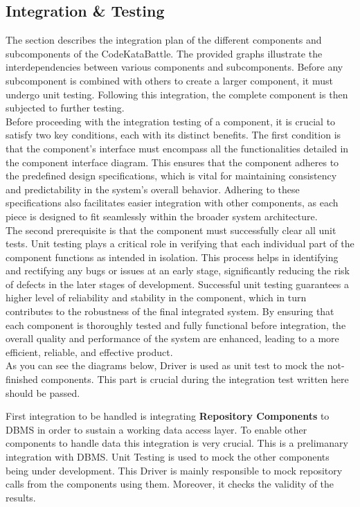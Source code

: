 \subsection{Integration \& Testing}
\indent The section describes the integration plan of the different components and subcomponents of the CodeKataBattle. The provided graphs illustrate the interdependencies between various components and subcomponents. Before any subcomponent is combined with others to create a larger component, it must undergo unit testing. Following this integration, the complete component is then subjected to further testing.
\\
\indent Before proceeding with the integration testing of a component, it is crucial to satisfy two key conditions, each with its distinct benefits. The first condition is that the component's interface must encompass all the functionalities detailed in the component interface diagram. This ensures that the component adheres to the predefined design specifications, which is vital for maintaining consistency and predictability in the system’s overall behavior. Adhering to these specifications also facilitates easier integration with other components, as each piece is designed to fit seamlessly within the broader system architecture.
\\
\indent The second prerequisite is that the component must successfully clear all unit tests. Unit testing plays a critical role in verifying that each individual part of the component functions as intended in isolation. This process helps in identifying and rectifying any bugs or issues at an early stage, significantly reducing the risk of defects in the later stages of development. Successful unit testing guarantees a higher level of reliability and stability in the component, which in turn contributes to the robustness of the final integrated system. By ensuring that each component is thoroughly tested and fully functional before integration, the overall quality and performance of the system are enhanced, leading to a more efficient, reliable, and effective product.
\\
\indent As you can see the diagrams below, Driver is used as unit test to mock the not-finished components. This part is crucial during the integration test written here should be passed. 

\newpage
\indent First integration to be handled is integrating \textbf{Repository Components} to DBMS in order to sustain a working data access layer. To enable other components to handle data this integration is very crucial. This is a prelimanary integration with DBMS. Unit Testing is used to mock the  other components being under development. This Driver is mainly responsible to mock repository calls from the components using them. Moreover, it checks the validity of the results.

